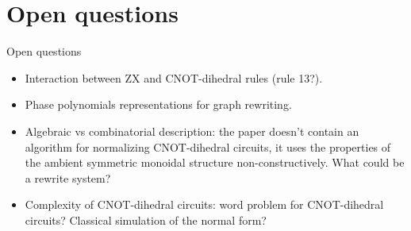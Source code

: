 \documentclass{beamer}
\theoremstyle{definition}
\begin{document}
\section{Open questions}
\begin{frame}{Open questions}
	\begin{itemize}
		\item Interaction between ZX and CNOT-dihedral rules (rule 13?).
		\item Phase polynomials representations for graph rewriting.
		\item Algebraic vs combinatorial description: the paper doesn't contain an algorithm for normalizing CNOT-dihedral circuits, it uses the properties of the ambient symmetric monoidal structure non-constructively. What could be a rewrite system?
		\item Complexity of CNOT-dihedral circuits: word problem for CNOT-dihedral circuits? Classical simulation of the normal form?
	\end{itemize}
\end{frame}
\end{document}
